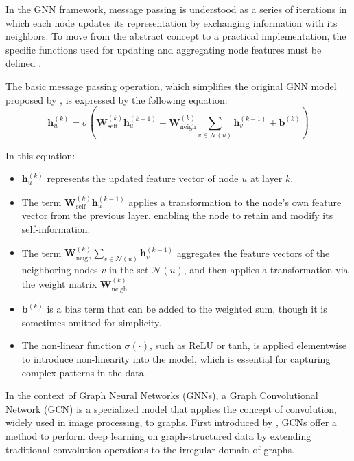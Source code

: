 In the GNN framework, message passing is understood as a series of iterations in which each node updates its representation by exchanging information with its neighbors. To move from the abstract concept to a practical implementation, the specific functions used for updating and aggregating node features must be defined \cite{Liu_Wu_Liu_Hu_2021}.


The basic message passing operation, which simplifies the original GNN model proposed by \cite{GRLB_Hamilton}, is expressed by the following equation:
\begin{equation}
 \mathbf{h}_u^{(k)} = \sigma\left( \mathbf{W}_{\text{self}}^{(k)} \mathbf{h}_u^{(k-1)} + \mathbf{W}_{\text{neigh}}^{(k)} \sum_{v \in \mathcal{N}(u)} \mathbf{h}_v^{(k-1)} + \mathbf{b}^{(k)} \right)  
    \label{eq:message_passing}
\end{equation}

In this equation:
\begin{itemize}
    \item \( \mathbf{h}_u^{(k)} \) represents the updated feature vector of node \( u \) at layer \( k \).
    \item The term \( \mathbf{W}_{\text{self}}^{(k)} \mathbf{h}_u^{(k-1)} \) applies a transformation to the node's own feature vector from the previous layer, enabling the node to retain and modify its self-information. 
    \item The term \( \mathbf{W}_{\text{neigh}}^{(k)} \sum_{v \in \mathcal{N}(u)} \mathbf{h}_v^{(k-1)} \) aggregates the feature vectors of the neighboring nodes \( v \) in the set \( \mathcal{N}(u) \), and then applies a transformation via the weight matrix \( \mathbf{W}_{\text{neigh}}^{(k)} \) 
    \item \( \mathbf{b}^{(k)} \) is a bias term that can be added to the weighted sum, though it is sometimes omitted for simplicity. 
    \item  The non-linear function \( \sigma(\cdot) \), such as ReLU or tanh, is applied elementwise to introduce non-linearity into the model, which is essential for capturing complex patterns in the data.

\end{itemize}



In the context of Graph Neural Networks (GNNs), a Graph Convolutional Network (GCN) is a specialized model that applies the concept of convolution, widely used in image processing, to graphs. First introduced by \cite{Kipf:2016tc}, GCNs offer a method to perform deep learning on graph-structured data by extending traditional convolution operations to the irregular domain of graphs.

